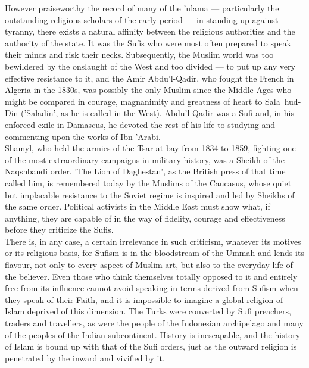 \documentclass[11pt, b5paper, twoside]{book}
\begin{document}
However praiseworthy the record of many of the 'ulama --- particularly the outstanding religious 
scholars of the early period --- in standing up against tyranny, there exists a natural affinity 
between the religious authorities and the authority of the state. It was the Sufis who were most 
often prepared to speak their minds and risk their necks. Subsequently, the Muslim world was too 
bewildered by the onslaught of the West and too divided --- to put up any very effective resistance to 
it, and the Amir Abdu'l-Qadir, who fought the French in Algeria in the 1830s, was possibly the only 
Muslim since the Middle Ages who might be compared in courage, magnanimity and greatness of heart to 
Sala~hud-Din ('Saladin', as he is called in the West). Abdu'l-Qadir was a Sufi and, in his enforced 
exile in Damascus, he devoted the rest of his life to studying and commenting upon the works of Ibn 
'Arabi. \\

Shamyl, who held the armies of the Tsar at bay from 1834 to 1859, fighting one of the most 
extraordinary campaigns in military history, was a Sheikh of the Naqshbandi order. 'The Lion of 
Daghestan', as the British press of that time called him, is remembered today by the Muslims of the 
Caucasus, whose quiet but implacable resistance to the Soviet regime is inspired and led by Sheikhs 
of the same order. Political activists in the Middle East must show what, if anything, they are 
capable of in the way of fidelity, courage and effectiveness before they criticize the Sufis. \\

There is, in any case, a certain irrelevance in such criticism, whatever its motives or its religious 
basis, for Sufism is in the bloodstream of the Ummah and lends its flavour, not only to every aspect 
of Muslim art, but also to the everyday life of the believer. Even those who think themselves totally 
opposed to it and entirely free from its influence cannot avoid speaking in terms derived from Sufism 
when they speak of their Faith, and it is impossible to imagine a global religion of Islam deprived 
of this dimension. The Turks were converted by Sufi preachers, traders and travellers, as were the 
people of the Indonesian archipelago and many of the peoples of the Indian subcontinent. History is 
inescapable, and the history of Islam is bound up with that of the Sufi orders, just as the outward 
religion is penetrated by the inward and vivified by it. \\
\end{document}
